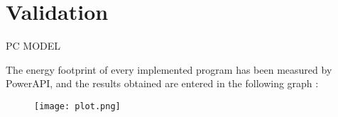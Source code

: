 \section{Validation}
\label{sec:Validation}
	PC MODEL
	
	The energy footprint of every implemented program has been measured by PowerAPI, and the results obtained are entered in the following graph :
\begin{figure}[H]
	\texttt{[image: plot.png]}
\end{figure}